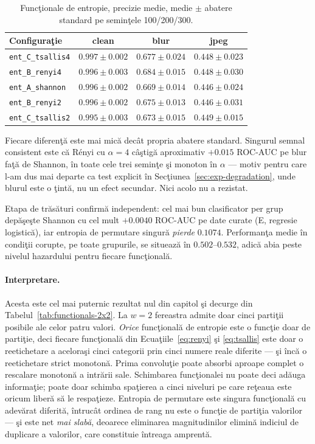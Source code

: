\begin{table}[h]
  \centering
  \caption{Funcţionale de entropie, precizie medie, medie $\pm$ abatere standard
  pe seminţele 100/200/300.}
  \label{tab:entropy-seeds}
  \begin{tabular}{lccc}
    \toprule
    Configuraţie & clean & blur & jpeg \\
    \midrule
    \texttt{ent\_C\_tsallis4} & $0.997 \pm 0.002$ & $0.677 \pm 0.024$ & $0.448 \pm 0.023$ \\
    \texttt{ent\_B\_renyi4}   & $0.996 \pm 0.003$ & $0.684 \pm 0.015$ & $0.448 \pm 0.030$ \\
    \texttt{ent\_A\_shannon}  & $0.996 \pm 0.002$ & $0.669 \pm 0.014$ & $0.446 \pm 0.024$ \\
    \texttt{ent\_B\_renyi2}   & $0.996 \pm 0.002$ & $0.675 \pm 0.013$ & $0.446 \pm 0.031$ \\
    \texttt{ent\_C\_tsallis2} & $0.995 \pm 0.003$ & $0.673 \pm 0.015$ & $0.449 \pm 0.015$ \\
    \bottomrule
  \end{tabular}
\end{table}

Fiecare diferenţă este mai mică decât propria abatere standard. Singurul semnal
consistent este că Rényi cu $\alpha=4$ câştigă aproximativ $+0.015$ ROC-AUC pe
blur faţă de Shannon, în toate cele trei seminţe şi monoton în $\alpha$ ---
motiv pentru care l-am dus mai departe ca test explicit în
Secţiunea~\ref{sec:exp-degradation}, unde blurul este o ţintă, nu un efect
secundar. Nici acolo nu a rezistat.

Etapa de trăsături confirmă independent: cel mai bun clasificator per grup
depăşeşte Shannon cu cel mult $+0.0040$ ROC-AUC pe date curate (E, regresie
logistică), iar entropia de permutare singură \emph{pierde} $0.1074$.
Performanţa medie în condiţii corupte, pe toate grupurile, se situează în
$0.502$--$0.532$, adică abia peste nivelul hazardului pentru fiecare
funcţională.

\paragraph{Interpretare.} Acesta este cel mai puternic rezultat nul din capitol
şi decurge din Tabelul~\ref{tab:functionals-2x2}. La $w=2$ fereastra admite doar
cinci partiţii posibile ale celor patru valori. \emph{Orice} funcţională de
entropie este o funcţie doar de partiţie, deci fiecare funcţională din
Ecuaţiile~\ref{eq:renyi} şi \ref{eq:tsallis} este doar o reetichetare a
aceloraşi cinci categorii prin cinci numere reale diferite --- şi încă o
reetichetare strict monotonă. Prima convoluţie poate absorbi aproape complet o
rescalare monotonă a intrării sale. Schimbarea funcţionalei nu poate deci adăuga
informaţie; poate doar schimba spaţierea a cinci niveluri pe care reţeaua este
oricum liberă să le respaţieze. Entropia de permutare este singura funcţională
cu adevărat diferită, întrucât ordinea de rang nu este o funcţie de partiţia
valorilor --- şi este net \emph{mai slabă}, deoarece eliminarea magnitudinilor
elimină indiciul de duplicare a valorilor, care constituie întreaga amprentă.

